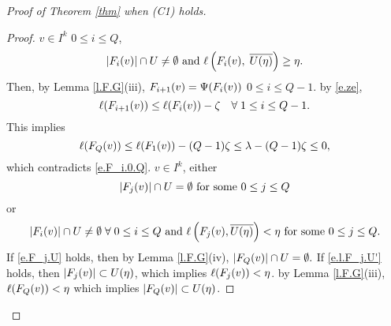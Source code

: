 \documentclass[11pt,twoside]{article}
\begin{document}
\begin{proof}[Proof of Theorem \ref{thm} when (C1) holds]
\begin{proof}
\sps \tes \(v\in I^k\) \st \fa \(0\leq i\leq Q\),
\begin{equation}\label{e.F_i.0.Q}
\left|F_i(v)\right|\cap U \neq \emptyset\text{ and } \ell\left(F_i(v),\;\overline{U(\eta)}\right)\geq \eta.
\end{equation}
Then, by Lemma \ref{l.F.G}(iii), \(F_{i+1}(v)=\Psi(F_i(v))\) \fa \(0\leq i \leq Q-1\). \hn by \eqref{e.ze},
\begin{equation}
\ell(F_{i+1}(v))\leq \ell(F_i(v))-\zeta\quad\forall\;1\leq i \leq Q-1.
\end{equation}
This implies
\[\ell(F_Q(v))\leq \ell(F_1(v))-(Q-1)\zeta\leq \lambda-(Q-1)\zeta\leq 0,\]
which contradicts \eqref{e.F_i.0.Q}. \tf \fa \(v\in I^k\), either 
\begin{equation}\label{e.F_j.U}
\left|F_j(v)\right|\cap U=\emptyset \text{ for some }0\leq j\leq Q
\end{equation}
or
\begin{equation}\label{e.l.F_j.U'}
\left|F_i(v)\right|\cap U \neq \emptyset\;\forall\;0\leq i\leq Q\text{ and } \ell\left(F_j(v),\overline{U(\eta)}\right)<\eta \text{ for some }0\leq j\leq Q.
\end{equation}
If \eqref{e.F_j.U} holds, then by Lemma \ref{l.F.G}(iv), \(\left|F_Q(v)\right|\cap U=\emptyset.\) If \eqref{e.l.F_j.U'} holds, then \(\left|F_j(v)\right|\subset U(\eta)\), which implies \(\ell(F_j(v))<\eta\). \tf by Lemma \ref{l.F.G}(iii), \(\ell(F_Q(v))<\eta\) which implies \(\left|F_Q(v)\right|\subset U(\eta)\).
\end{proof}


\end{proof}
\end{document}
